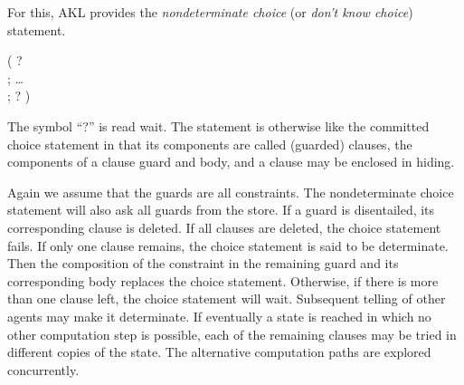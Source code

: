 For this, AKL provides the {\em nondeterminate choice} (or {\em don't
know choice}) statement.
%
\begin{progex}
(  ?  \\
; \dots \\
;  ?  )
\end{progex}%
%
The symbol ``{\prog ?}'' is read wait.  The statement is otherwise
like the committed choice statement in that its components are called
(guarded) clauses, the components of a clause guard and body, and a
clause may be enclosed in hiding.

Again we assume that the guards are all constraints.  The
nondeterminate choice statement will also ask all guards from the
store.  If a guard is disentailed, its corresponding clause is
deleted.  If all clauses are deleted, the choice statement fails.  If
only one clause remains, the choice statement is said to be
determinate.  Then the composition of the constraint in the remaining
guard and its corresponding body replaces the choice statement.
Otherwise, if there is more than one clause left, the choice statement
will wait.  Subsequent telling of other agents may make it
determinate.  If eventually a state is reached in which no other
computation step is possible, each of the remaining clauses may be
tried in different copies of the state.  The alternative computation
paths are explored concurrently.


